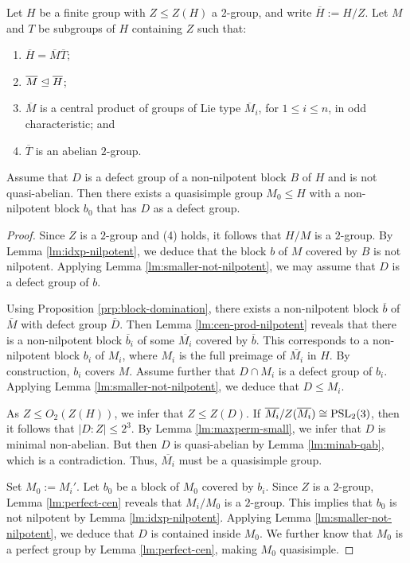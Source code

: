 \documentclass[bysection, amsart]{standard}
\begin{document}
\begin{lemma} \label{lm:smaller-non-nilpotent}
    Let $H$ be a finite group with $Z \leq Z(H)$ a $2$-group, and write $\overline{H} := H/Z$. Let $M$ and $T$ be subgroups of $H$ containing $Z$ such that:
    \begin{enumerate}
        \item $\overline{H} = \overline{M} \overline{T}$;
        \item $\overline{M} \trianglelefteq \overline{H}$;
        \item $\overline{M}$ is a central product of groups of Lie type $\overline{M}_i$, for $1 \leq i \leq n$, in odd characteristic; and
        \item $\overline{T}$ is an abelian $2$-group.
    \end{enumerate}
    Assume that $D$ is a defect group of a non-nilpotent block $B$ of $H$ and is not quasi-abelian. Then there exists a quasisimple group $M_0 \leq H$ with a non-nilpotent block $b_0$ that has $D$ as a defect group.
\end{lemma}
\begin{proof}
    Since $Z$ is a $2$-group and (4) holds, it follows that $H/M$ is a $2$-group. By Lemma \ref{lm:idxp-nilpotent}, we deduce that the block $b$ of $M$ covered by $B$ is not nilpotent. Applying Lemma \ref{lm:smaller-not-nilpotent}, we may assume that $D$ is a defect group of $b$.

    Using Proposition \ref{prp:block-domination}, there exists a non-nilpotent block $\overline{b}$ of $\overline{M}$ with defect group $\overline{D}$. Then Lemma \ref{lm:cen-prod-nilpotent} reveals that there is a non-nilpotent block $\overline{b}_i$ of some $\overline{M_i}$ covered by $\overline{b}$. This corresponds to a non-nilpotent block $b_i$ of $M_i$, where $M_i$ is the full preimage of $\overline{M_i}$ in $H$. By construction, $b_i$ covers $M$. Assume further that $D \cap M_i$ is a defect group of $b_i$. Applying Lemma \ref{lm:smaller-not-nilpotent}, we deduce that $D \leq M_i$.

    As $Z \leq O_2(Z(H))$, we infer that $Z \leq Z(D)$. If $\overline{M_i}/Z(\overline{M_i}) \cong \operatorname{PSL}_2(3)$, then it follows that $|D : Z| \leq 2^3$. By Lemma \ref{lm:maxperm-small}, we infer that $D$ is minimal non-abelian. But then $D$ is quasi-abelian by Lemma \ref{lm:minab-qab}, which is a contradiction. Thus, $\overline{M_i}$ must be a quasisimple group.

    Set $M_0 := M_i'$. Let $b_0$ be a block of $M_0$ covered by $b_i$. Since $Z$ is a $2$-group, Lemma \ref{lm:perfect-cen} reveals that $M_i/M_0$ is a $2$-group. This implies that $b_0$ is not nilpotent by Lemma \ref{lm:idxp-nilpotent}. Applying Lemma \ref{lm:smaller-not-nilpotent}, we deduce that $D$ is contained inside $M_0$. We further know that $M_0$ is a perfect group by Lemma \ref{lm:perfect-cen}, making $M_0$ quasisimple.
\end{proof}
\end{document}
